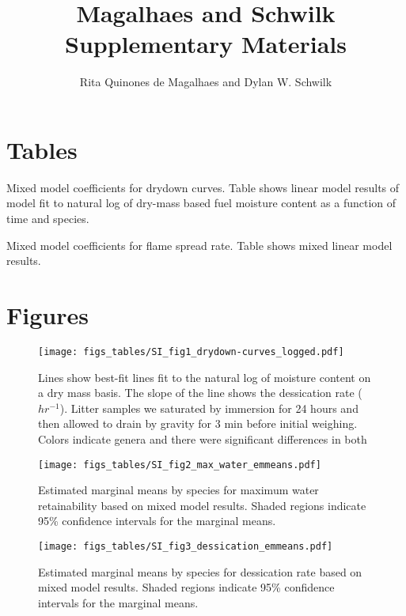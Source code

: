 \documentclass[letterpaper]{article}
\title{Magalhaes and Schwilk Supplementary Materials}
\author{Rita Quinones de Magalhaes and Dylan W. Schwilk}
\begin{document}
\maketitle

\section{Tables}

\begin{table}[h]
  \caption{Mixed model coefficients for drydown curves. Table shows linear model results of model fit to  natural log of dry-mass based fuel moisture content as a function of time and species.} 
  \label{tabS1}
\centering

\end{table}

\begin{table}[h]
  \caption{Mixed model coefficients for flame spread rate. Table shows mixed linear model results.} 
  \label{tabS3}
\centering

\end{table}

\section{Figures}


\begin{figure}[h]
  \centering
  \texttt{[image: figs\_tables/SI\_fig1\_drydown-curves\_logged.pdf]}
   \label{SI_fig1}
\caption[Semi-log scale dry down curves for eight litter types.]{Lines show best-fit lines fit to the natural log of moisture content on a dry mass basis.  The slope of the line shows the dessication rate ($hr^{-1}$). Litter samples we saturated by immersion for 24 hours and then allowed to drain by gravity for 3 min before initial weighing. Colors indicate genera and there were significant differences in both }

\end{figure}



\begin{figure}[h]
  \centering
  \label{SI_fig2}
  \texttt{[image: figs\_tables/SI\_fig2\_max\_water\_emmeans.pdf]}
\caption{Estimated marginal means by species for maximum water retainability based on mixed model results. Shaded regions indicate 95\% confidence intervals for the marginal means.}
\end{figure}


\begin{figure}[h]
  \centering
  \label{fig-S2}
\texttt{[image: figs\_tables/SI\_fig3\_dessication\_emmeans.pdf]}
\caption{Estimated marginal means by species for dessication rate based on mixed model results. Shaded regions indicate 95\% confidence intervals for the marginal means.}
\end{figure}
\end{document}
